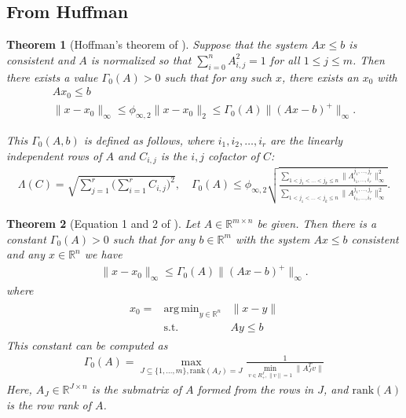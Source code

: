 \documentclass{article}
\newtheorem{theorem}{Theorem}[section]
\theoremstyle{case}
\numberwithin{theorem}{subsection}
\DeclareMathOperator*{\argmin}{arg\,min}
\newcommand{\huff}{{\Gamma_0}}
\newcommand{\Rm}{\mathbb R^m}
\newcommand{\Rn}{\mathbb R^n}
\begin{document}
\subsection{From Huffman}



\color{red}
\begin{theorem}[Hoffman's theorem of \cite{dummy:hoffman}]
\label{hoffman_old}
Suppose that the system $Ax \le b$ is consistent and $A$ is normalized so that $\sum_{i = 0}^n{A}_{i,j}^2 = 1$ for all $1 \le j \le m$.
Then there exists a value $\huff(A) > 0$ such that for any such $x$, there exists an $x_0$ with
\begin{align*}
Ax_0 \le b \\
\|x - x_0\|_{\infty} \le \phi_{\infty, 2}\|x - x_0\|_2 \le {\huff(A)} \|(Ax - b)^+\|_\infty.
\end{align*}

This $\huff(A,b)$ is defined as follows, where $i_1, i_2, \ldots, i_r$ are the linearly independent rows of $A$ and $C_{i,j}$ is the $i,j$ cofactor of $C$:
\begin{align*}
\Lambda(C) = \sqrt{\sum_{j=1}^r\bigg(\sum_{i=1}^r C_{i,j}\bigg)^2}, \quad
{\huff(A)} \le \phi_{\infty, 2}\sqrt{\frac{\sum_{1 < j_1 < \ldots < j_k \le n} \|\Lambda^{j_1,\ldots,j_r}_{i_1,\ldots, i_r}\|_{\infty}^2}{\sum_{1 < j_1 < \ldots < j_k \le n} \|A^{j_1,\ldots,j_r}_{i_1,\ldots, i_r}\|_{\infty}^2}}.
\end{align*}
\end{theorem}



\begin{theorem}[Equation 1 and 2 of \cite{pena2018algorithm}]
\label{hoffman}
Let $A \in \mathbb R^{m \times n}$ be given.
Then there is a constant $\huff(A) > 0$ such that for any $b \in \Rm$ with the system $Ax \le b$ consistent and any $x \in \Rn$ we have
\begin{align*}
\|x - x_0\|_{\infty} \le \huff(A) \|(Ax - b)^+\|_\infty.
\end{align*}
where
\begin{align*}
\begin{array}{ccc}
x_0 = & \argmin_{y \in \Rn} & \|x - y\| \\
      & \textrm{s.t.}    & Ay \le b
\end{array}
\end{align*}
This constant can be computed as
\begin{align*}
\huff(A) = \max_{J \subseteq \{1,\ldots,m\}, \textrm{rank}(A_J) = J} \frac 1 {\min_{v \in R^J_{+}, \|v\| = 1} \|A_J^Tv\|}
\end{align*}
Here, $A_J \in \mathbb R^{J \times n}$ is the submatrix of $A$ formed from the rows in $J$, and $\textrm{rank}(A)$ is the row rank of $A$.
\end{theorem}
\end{document}
